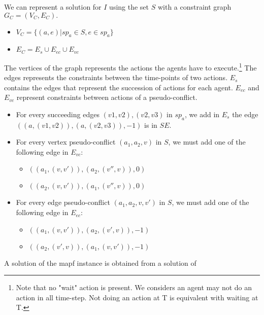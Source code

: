 We can represent a solution for $I$ using the set $S$ with a constraint graph $G_C=(V_C,E_C).$
\begin{itemize}
  \item $V_C = \{(a,e) | sp_a \in S, e \in sp_a \}$
  \item $E_C = E_s \cup E_{ec} \cup E_{vc}$
\end{itemize}
The vertices of the graph represents the actions the agents have to execute.\footnote{Note that no "wait" action is present. We considers an agent may not do an action in all time-step. Not doing an action at T is equivalent with waiting at T.}
The edges represents the constraints between the time-points of two actions. $E_s$ contains the edges that represent the succession of actions for each agent. $E_{ec}$ and $E_{vc}$ represent constraints between actions of a pseudo-conflict.

\begin{itemize}
  \item For every succeeding edges $(v1,v2),(v2,v3)$ in $sp_a$, we add in $E_s$ the edge $((a,(v1,v2)),(a,(v2,v3)),-1)$ is in $SE$.
  \item For every vertex pseudo-conflict $(a_1,a_2,v)$ in $S$, we must add one of the following edge in $E_{vc}$:
  \begin{itemize}
    \item $((a_1,(v,v')),(a_2,(v'',v)),0)$
    \item $((a_2,(v,v')),(a_1,(v'',v)),0)$
  \end{itemize}
  \item For every edge pseudo-conflict $(a_1,a_2,v,v')$ in $S$, we must add one of the following edge in $E_{ec}$:
  \begin{itemize}
    \item $((a_1,(v,v')),(a_2,(v',v)),-1)$
    \item $((a_2,(v',v)),(a_1,(v,v')),-1)$
  \end{itemize}
\end{itemize}

A solution of the mapf instance is obtained from a solution of 

